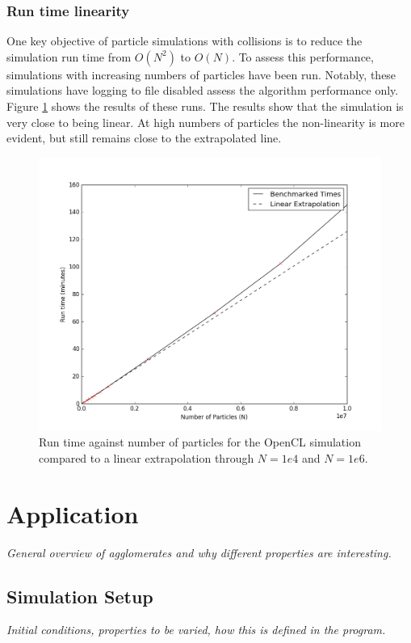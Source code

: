 \documentclass[10pt,a4paper,titlepage]{report}
\begin{document}
\subsection{Run time linearity}
One key objective of particle simulations with collisions is to reduce the simulation run time from $O(N^2)$ to $O(N)$. To assess this performance, simulations with increasing numbers of particles have been run. Notably, these simulations have logging to file disabled assess the algorithm performance only. Figure \ref{fig:opencl_performance} shows the results of these runs. The results show that the simulation is very close to being linear. At high numbers of particles the non-linearity is more evident, but still remains close to the extrapolated line.
\begin{figure}[!htb]
\centering
\includegraphics[scale=0.7]{figures/opencl_performance.png}
\caption{Run time against number of particles for the OpenCL simulation compared to a linear extrapolation through $N=1e4$ and $N=1e6$.}
\label{fig:opencl_performance}
\end{figure}
\chapter{Application}
\label{ch:Application}
\textit{General overview of agglomerates and why different properties are interesting.}
\section{Simulation Setup}
\textit{Initial conditions, properties to be varied, how this is defined in the program.}
\end{document}
